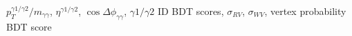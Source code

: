 $p_T^{\gamma 1/\gamma 2}/m_{\gamma\gamma}$, $\eta^{\gamma 1/\gamma 2}$, $\cos{\Delta\phi_{\gamma\gamma}}$, $\gamma 1/\gamma 2$ ID BDT scores, $\sigma_{RV}$, $\sigma_{WV}$, vertex probability BDT score